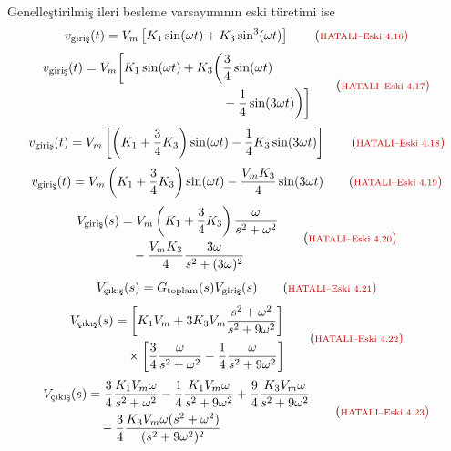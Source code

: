 Genelleştirilmiş ileri besleme varsayımının eski türetimi ise
\begin{equation*}
  v_{\text{giriş}}(t)
  =V_m\left[K_1\sin(\omega t)+K_3\sin^3(\omega t)\right]
  \hatalieskitag{4.16}
\end{equation*}
\begin{equation*}
  \begin{aligned}
  v_{\text{giriş}}(t)
  =V_m\bigg[K_1\sin(\omega t)+K_3\bigg(&\frac{3}{4}\sin(\omega t)\\
  &-\frac{1}{4}\sin(3\omega t)\bigg)\bigg]
  \end{aligned}
  \hatalieskitag{4.17}
\end{equation*}
\begin{equation*}
  v_{\text{giriş}}(t)
  =V_m\left[\left(K_1+\frac{3}{4}K_3\right)\sin(\omega t)
  -\frac{1}{4}K_3\sin(3\omega t)\right]
  \hatalieskitag{4.18}
\end{equation*}
\begin{equation*}
  v_{\text{giriş}}(t)
  =V_m\left(K_1+\frac{3}{4}K_3\right)\sin(\omega t)
  -\frac{V_mK_3}{4}\sin(3\omega t)
  \hatalieskitag{4.19}
\end{equation*}
\begin{equation*}
  \begin{aligned}
  V_{\text{giriş}}(s)
  &=V_m\left(K_1+\frac{3}{4}K_3\right)\frac{\omega}{s^2+\omega^2}\\
  &\quad-\frac{V_mK_3}{4}\frac{3\omega}{s^2+(3\omega)^2}
  \end{aligned}
  \hatalieskitag{4.20}
\end{equation*}
\begin{equation*}
  V_{\text{çıkış}}(s)
  =G_{\mathrm{toplam}}(s)V_{\text{giriş}}(s)
  \hatalieskitag{4.21}
\end{equation*}
\begin{equation*}
  \begin{aligned}
  V_{\text{çıkış}}(s)
  &=\left[K_1V_m+3K_3V_m\frac{s^2+\omega^2}{s^2+9\omega^2}\right]\\
  &\quad\times\left[\frac{3}{4}\frac{\omega}{s^2+\omega^2}
  -\frac{1}{4}\frac{\omega}{s^2+9\omega^2}\right]
  \end{aligned}
  \hatalieskitag{4.22}
\end{equation*}
\begin{equation*}
  \begin{aligned}
  V_{\text{çıkış}}(s)
  &=\frac{3}{4}\frac{K_1V_m\omega}{s^2+\omega^2}
  -\frac{1}{4}\frac{K_1V_m\omega}{s^2+9\omega^2}
  +\frac{9}{4}\frac{K_3V_m\omega}{s^2+9\omega^2}\\
  &\quad-\frac{3}{4}
  \frac{K_3V_m\omega(s^2+\omega^2)}{(s^2+9\omega^2)^2}
  \end{aligned}
  \hatalieskitag{4.23}
\end{equation*}
